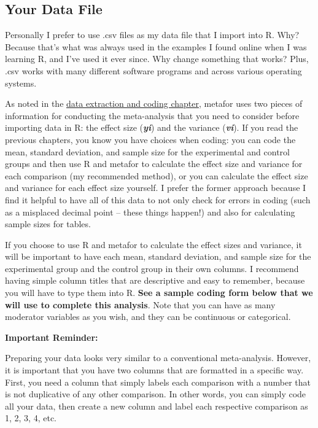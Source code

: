 \documentclass[
]{book}
\begin{document}
\hypertarget{your-data-file-1}{%
\subsection{Your Data File}\label{your-data-file-1}}

Personally I prefer to use .csv files as my data file that I import into R. Why? Because that's what was always used in the examples I found online when I was learning R, and I've used it ever since. Why change something that works? Plus, .csv works with many different software programs and across various operating systems. ~

As noted in the \protect\hyperlink{crossdata}{data extraction and coding chapter}, metafor uses two pieces of information for conducting the meta-analysis that you need to consider before importing data in R: the effect size (\textbf{\emph{yi}}) and the variance (\textbf{\emph{vi}}). If you read the previous chapters, you know you have choices when coding: you can code the mean, standard deviation, and sample size for the experimental and control groups and then use R and metafor to calculate the effect size and variance for each comparison (my recommended method), or you can calculate the effect size and variance for each effect size yourself. I prefer the former approach because I find it helpful to have all of this data to not only check for errors in coding (such as a misplaced decimal point -- these things happen!) and also for calculating sample sizes for tables.

If you choose to use R and metafor to calculate the effect sizes and variance, it will be important to have each mean, standard deviation, and sample size for the experimental group and the control group in their own columns. I recommend having simple column titles that are descriptive and easy to remember, because you will have to type them into R. \textbf{See a sample coding form below that we will use to complete this analysis}. Note that you can have as many moderator variables as you wish, and they can be continuous or categorical.

\textbf{Important Reminder:}

Preparing your data looks very similar to a conventional meta-analysis. However, it is important that you have two columns that are formatted in a specific way. First, you need a column that simply labels each comparison with a number that is not duplicative of any other comparison. In other words, you can simply code all your data, then create a new column and label each respective comparison as 1, 2, 3, 4, etc.
\end{document}
